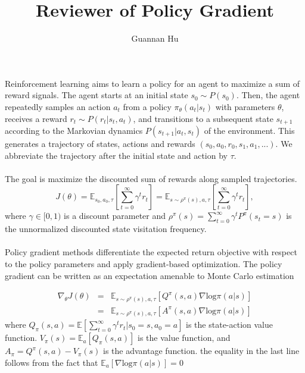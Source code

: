 \documentclass[12pt,a4paper]{article}
\begin{document}
\title{Reviewer of Policy Gradient}
\author{Guannan Hu}
\maketitle
\paragraph{} Reinforcement learning aims to learn a policy for an agent to maximize a sum of reward signals. The agent starts at an initial state $s_{0} \sim P(s_{0})$. Then, the agent repeatedly samples an action $a_{t}$ from a policy $\pi_{\theta}(a_{t}|s_{t})$ with parameters $\theta$, receives a reward $r_{t} \sim P(r_{t}|s_{t}, a_{t})$, and transitions to a subsequent state $s_{t+1}$ according to the Markovian dynamics $P(s_{t+1}|a_{t}, s_{t})$ of the environment. This generates a trajectory of states, actions and rewards $(s_0, a_0, r_0, s_1, a_1, ...)$. We abbreviate the trajectory after the initial state and action by $\tau$.
\paragraph{} The goal is maximize the discounted sum of rewards along sampled trajectories.
\begin{equation*}
J(\theta) = \mathbb{E}_{s_0, a_0, \tau} \left[ \sum_{t=0}^{\infty}\gamma^{t}r_{t} \right] = \mathbb{E}_{s \sim \rho^{\pi}(s), a, \tau}\left[\sum_{t=0}^{\infty}\gamma^{t}r_{t}\right],
\end{equation*}
where $\gamma \in [0, 1)$ is a discount parameter and $\rho^{\pi}(s) = \sum_{t=0}^{\infty}\gamma^{t}P^{\pi}(s_{t}=s)$ is the unnormalized discounted state visitation frequency.

\paragraph{} Policy gradient methods differentiate the expected return objective with respect to the policy parameters and apply gradient-based optimization. The policy gradient can be written as an expectation amenable to Monte Carlo estimation

\begin{equation}
\begin{aligned}
\nabla_{\theta}J(\theta) & = & \mathbb{E}_{s \sim \rho^{\pi}(s),a,\tau}\left[Q^{\pi}(s,a)\nabla \text{log} \pi(a|s)\right]\\
                         & = & \mathbb{E}_{s \sim \rho^{\pi}(s), a, \tau}\left[A^{\pi}(s,a)\nabla \text{log} \pi(a|s)\right]
\end{aligned}
\end{equation}
where $Q_{\pi}(s,a)=\mathbb{E}\left[\sum_{t=0}^{\infty}\gamma^{t}r_{t}|s_{0}=s, a_{0}=a\right]$ is the state-action value function. $V_{\pi}(s) = \mathbb{E}_{a}[Q_{\pi}(s,a)]$ is the value function, and $A_{\pi} = Q^{\pi}(s,a) - V_{\pi}(s)$ is the advantage function. the equality in the last line follows from the fact that $\mathbb{E}_{a}[\nabla \text{log} \pi(a|s)] = 0$


\end{document}

